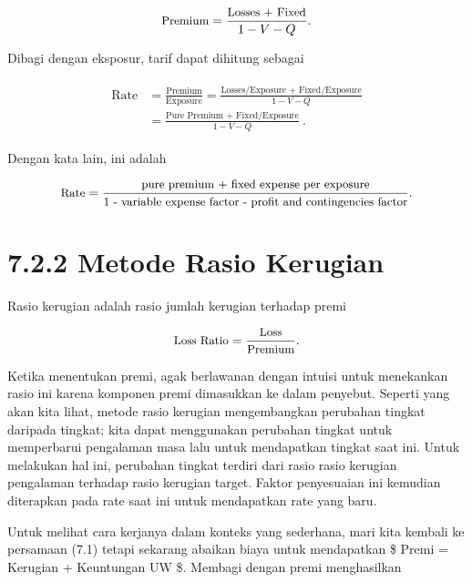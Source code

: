 \documentclass[
]{book}
\begin{document}
\begin{equation}
\small{
\text{Premium} = \frac{\text{Losses + Fixed}}{1-V-Q} .
}
\end{equation}

Dibagi dengan eksposur, tarif dapat dihitung sebagai

\begin{equation}
\begin{matrix}
\begin{array}{ll}
\text{Rate} &= \frac{\text{Premium}}{\text{Exposure}} = \frac{\text{Losses/Exposure + Fixed/Exposure}}{1-V-Q} \\
&=   \frac{\text{Pure Premium + Fixed/Exposure}}{1-V-Q} ~.
\end{array}
\end{matrix}
\end{equation}

Dengan kata lain, ini adalah

\begin{equation}
\small{
\text{Rate} =\frac{\text{pure premium + fixed expense per exposure}}{\text{1 - variable expense factor - profit and contingencies factor}}  .
}
\end{equation}

\hypertarget{metode-rasio-kerugian}{%
\section{7.2.2 Metode Rasio Kerugian}\label{metode-rasio-kerugian}}

Rasio kerugian adalah rasio jumlah kerugian terhadap premi

\begin{equation}
\small{
\text{Loss Ratio} = \frac{\text{Loss}}{\text{Premium}} .
}
\end{equation}

Ketika menentukan premi, agak berlawanan dengan intuisi untuk menekankan rasio ini karena komponen premi dimasukkan ke dalam penyebut. Seperti yang akan kita lihat, metode rasio kerugian mengembangkan perubahan tingkat daripada tingkat; kita dapat menggunakan perubahan tingkat untuk memperbarui pengalaman masa lalu untuk mendapatkan tingkat saat ini. Untuk melakukan hal ini, perubahan tingkat terdiri dari rasio rasio kerugian pengalaman terhadap rasio kerugian target. Faktor penyesuaian ini kemudian diterapkan pada rate saat ini untuk mendapatkan rate yang baru.

Untuk melihat cara kerjanya dalam konteks yang sederhana, mari kita kembali ke persamaan (7.1) tetapi sekarang abaikan biaya untuk mendapatkan \$ Premi = Kerugian + Keuntungan UW \$. Membagi dengan premi menghasilkan
\end{document}
